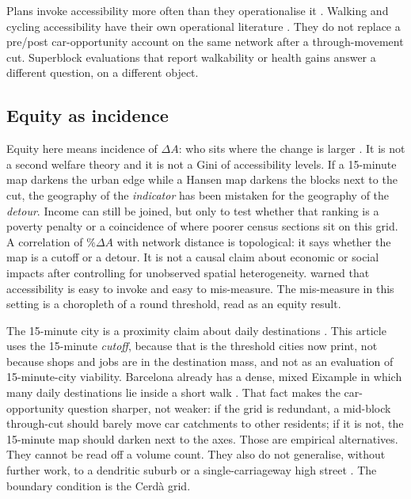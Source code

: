 \documentclass[a4paper,fleqn]{cas-dc}
\begin{document}
Plans invoke accessibility more often than they operationalise it
\citep{Boisjoly2017}. Walking and cycling accessibility have their own
operational literature \citep{Vale2016,Marquet2015}. They do not replace a
pre/post car-opportunity account on the same network after a through-movement
cut. Superblock evaluations that report walkability or health gains
\citep{Mueller2020} answer a different question, on a different object.

\subsection{Equity as incidence}

Equity here means incidence of $\Delta A$: who sits where the change is
larger \citep{Pereira2017,Neutens2015,Lucas2012,Martens2017,Foth2013}. It is
not a second welfare theory and it is not a Gini of accessibility levels.
If a 15-minute map darkens the urban edge while a Hansen map darkens the
blocks next to the cut, the geography of the \emph{indicator} has been
mistaken for the geography of the \emph{detour}. Income can still be joined,
but only to test whether that ranking is a poverty penalty or a coincidence
of where poorer census sections sit on this grid. A correlation of
$\%\Delta A$ with network distance is topological: it says whether the map
is a cutoff or a detour. It is not a causal claim about economic or social
impacts after controlling for unobserved spatial heterogeneity.
\citet{Handy2020} warned
that accessibility is easy to invoke and easy to mis-measure. The mis-measure
in this setting is a choropleth of a round threshold, read as an equity
result.

The 15-minute city is a proximity claim about daily destinations
\citep{Moreno2021,Pozoukidou2021}. This article uses the 15-minute
\emph{cutoff}, because that is the threshold cities now print, not because
shops and jobs are in the destination mass, and not as an evaluation of
15-minute-city viability. Barcelona already has a dense,
mixed Eixample in which many daily destinations lie inside a short walk
\citep{Marquet2015}. That fact makes the car-opportunity question sharper,
not weaker: if the grid is redundant, a mid-block through-cut should barely
move car catchments to other residents; if it is not, the 15-minute map
should darken next to the axes. Those are empirical alternatives. They
cannot be read off a volume count. They also do not generalise, without
further work, to a dendritic suburb or a single-carriageway high street
\citep{Thomas2024,Parady2025,Verlinghieri2025}. The boundary condition is
the Cerd\`a grid.
\end{document}
